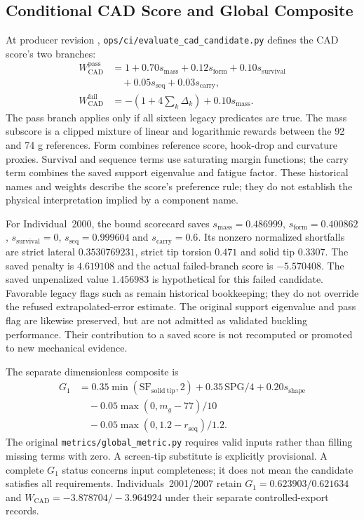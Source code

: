 \subsection{Conditional CAD Score and Global Composite}
At producer revision , \nolinkurl{ops/ci/evaluate_cad_candidate.py} defines the CAD score's two branches:
\begin{align}
 W_{\mathrm{CAD}}^{\mathrm{pass}} &=1+0.70s_{\mathrm{mass}}+0.12s_{\mathrm{form}}+0.10s_{\mathrm{survival}}\nonumber\\
 &\quad+0.05s_{\mathrm{seq}}+0.03s_{\mathrm{carry}},\\
 W_{\mathrm{CAD}}^{\mathrm{fail}} &=-\left(1+4\sum_k\Delta_k\right)+0.10s_{\mathrm{mass}}.
\end{align}
The pass branch applies only if all sixteen legacy predicates are true. The mass subscore is a clipped mixture of linear and logarithmic rewards between the 92 and 74 g references. Form combines reference score, hook-drop and curvature proxies. Survival and sequence terms use saturating margin functions; the carry term combines the saved support eigenvalue and fatigue factor. These historical names and weights describe the score's preference rule; they do not establish the physical interpretation implied by a component name.

For Individual~2000, the bound scorecard saves $s_{\mathrm{mass}}=0.486999$, $s_{\mathrm{form}}=0.400862$, $s_{\mathrm{survival}}=0$, $s_{\mathrm{seq}}=0.999604$ and $s_{\mathrm{carry}}=0.6$. Its nonzero normalized shortfalls are strict lateral $0.3530769231$, strict tip torsion $0.471$ and solid tip $0.3307$. The saved penalty is $4.619108$ and the actual failed-branch score is $-5.570408$. The saved unpenalized value $1.456983$ is hypothetical for this failed candidate. Favorable legacy flags such as  remain historical bookkeeping; they do not override the refused extrapolated-error estimate. The original support eigenvalue and pass flag are likewise preserved, but are not admitted as validated buckling performance. Their contribution to a saved score is not recomputed or promoted to new mechanical evidence.

The separate dimensionless composite is
\begin{align}
 G_1&=0.35\min(\mathrm{SF}_{\mathrm{solid\ tip}},2)+0.35\,\mathrm{SPG}/4+0.20s_{\mathrm{shape}}\nonumber\\
 &\quad-0.05\max(0,m_g-77)/10\nonumber\\
 &\quad-0.05\max(0,1.2-r_{\mathrm{seq}})/1.2.
\end{align}
The original \nolinkurl{metrics/global_metric.py} requires valid inputs rather than filling missing terms with zero. A screen-tip substitute is explicitly provisional. A complete $G_1$ status concerns input completeness; it does not mean the candidate satisfies all requirements. Individuals~2001/2007 retain $G_1=0.623903/0.621634$ and $W_{\mathrm{CAD}}=-3.878704/-3.964924$ under their separate controlled-export records.

